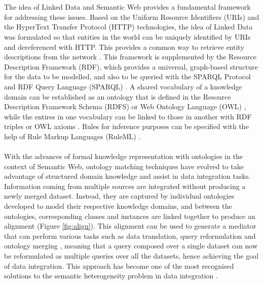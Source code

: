 \\\\
The idea of Linked Data and Semantic Web provides a fundamental framework for addressing these issues. Based on the Uniform Resource Identifiers (URIs) \cite{DBLP:journals/rfc/rfc3986} and the HyperText Transfer Protocol (HTTP) \cite{DBLP:journals/rfc/rfc7540} technologies, the idea of Linked Data was formulated so that entities in the world can be uniquely identified by URIs and dereferenced with HTTP. This provides a common way to retrieve entity descriptions from the network \cite{DBLP:journals/ijswis/BizerHB09}. This framework is supplemented by the Resource Description Framework (RDF), which provides a universal, graph-based structure for the data to be modelled, and also to be queried with the SPARQL Protocol and RDF Query Language (SPARQL) \cite{DBLP:journals/tods/PerezAG09}. A shared vocabulary of a knowledge domain can be established as an ontology that is defined in the Resource Description Framework Schema (RDFS) or Web Ontology Language (OWL) \cite{DBLP:journals/expert/ShadboltBH06}, while the entires in one vocabulary can be linked to those in another with RDF triples or OWL axioms \cite{DBLP:journals/ijswis/BizerHB09}. Rules for inference purposes can be specified with the help of Rule Markup Languages (RuleML) \cite{DBLP:journals/entcs/MeiB06}.
\\\\
With the advances of formal knowledge representation with ontologies in the context of Semantic Web, ontology matching techniques have evolved to take advantage of structured domain knowledge and assist in data integration tasks. Information coming from multiple sources are integrated without producing a newly merged dataset. Instead, they are captured by individual ontologies developed to model their respective knowledge domains, and between the ontologies, corresponding classes and instances are linked together to produce an alignment (Figure \ref{fig:align}). This alignment can be used to generate a mediator that can perform various tasks such as data translation, query reformulation and ontology merging \cite{euzenat2013d}, meaning that a query composed over a single dataset can now be reformulated as multiple queries over all the datasets, hence achieving the goal of data integration. This approach has become one of the most recognised solutions to the semantic heterogeneity problem in data integration \cite{DBLP:conf/gil/NafissiBF18}.
\\\\
